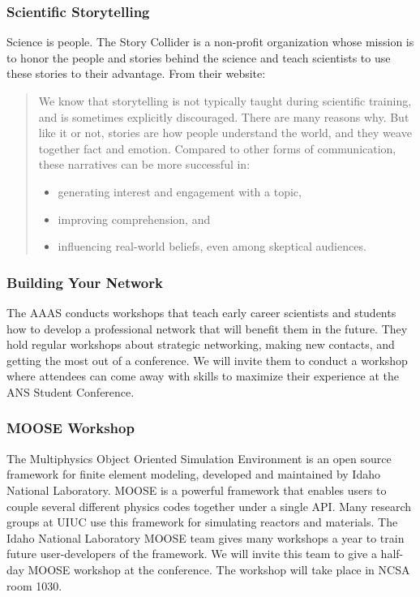 \subsubsection{Scientific Storytelling}
Science is people. The Story Collider is a non-profit organization whose mission is to honor the people and stories behind the science and teach scientists to use these stories to their advantage. From their website:
\begin{quote}
	We know that storytelling is not typically taught during scientific training, and is sometimes explicitly discouraged. There are many reasons why. But like it or not, stories are how people understand the world, and they weave together fact and emotion. Compared to other forms of communication, these narratives can be more successful in:
	\begin{itemize}
		\item generating interest and engagement with a topic,
		\item improving comprehension, and
		\item influencing real-world beliefs, even among skeptical audiences.
	\end{itemize}
\end{quote}

\subsubsection{Building Your Network}
The AAAS conducts workshops that teach early career scientists and students how to develop a professional network that will benefit them in the future. They hold regular workshops about strategic networking, making new contacts, and getting the most out of a conference. We will invite them to conduct a workshop where attendees can come away with skills to maximize their experience at the ANS Student Conference.

\subsubsection{MOOSE Workshop}
The Multiphysics Object Oriented Simulation Environment is an open source framework for finite element modeling, developed and maintained by Idaho National Laboratory. MOOSE is a powerful framework that enables users to couple several different physics codes together under a single API. Many research groups at UIUC use this framework for simulating reactors and materials. The Idaho National Laboratory MOOSE team gives many workshops a year to train future user-developers of the framework. We will invite this team to give a half-day MOOSE workshop at the conference. The workshop will take place in NCSA room 1030.

